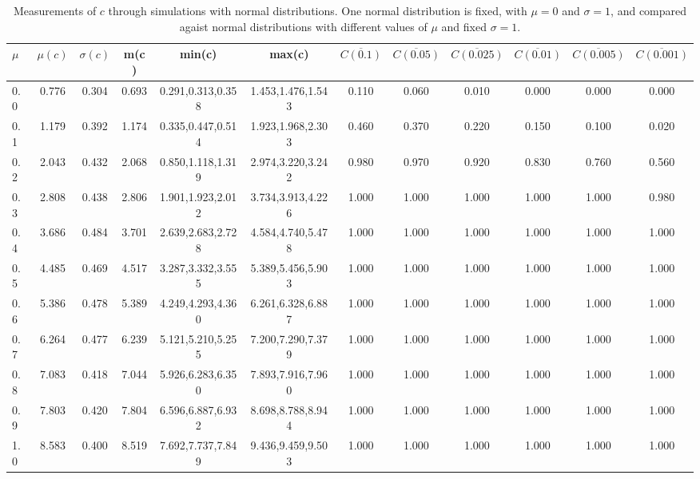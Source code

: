 \begin{table*}[h!]
\begin{center}
\begin{tabular}{| l | c | c | c | c | c | c | c | c | c | c | c |}\hline
$\mu$ & $\mu(c)$ & $\sigma(c)$ & m(c) & min(c) & max(c) & $\overline{C(0.1)}$ & $\overline{C(0.05)}$ & $\overline{C(0.025)}$ & $\overline{C(0.01)}$ & $\overline{C(0.005)}$ & $\overline{C(0.001)}$ \\\hline
0.0 & 0.776 & 0.304 & 0.693 & 0.291,0.313,0.358 & 1.453,1.476,1.543  & 0.110  & 0.060  & 0.010  & 0.000  & 0.000  & 0.000 \\\hline
0.1 & 1.179 & 0.392 & 1.174 & 0.335,0.447,0.514 & 1.923,1.968,2.303  & 0.460  & 0.370  & 0.220  & 0.150  & 0.100  & 0.020 \\\hline
0.2 & 2.043 & 0.432 & 2.068 & 0.850,1.118,1.319 & 2.974,3.220,3.242  & 0.980  & 0.970  & 0.920  & 0.830  & 0.760  & 0.560 \\\hline
0.3 & 2.808 & 0.438 & 2.806 & 1.901,1.923,2.012 & 3.734,3.913,4.226  & 1.000  & 1.000  & 1.000  & 1.000  & 1.000  & 0.980 \\\hline
0.4 & 3.686 & 0.484 & 3.701 & 2.639,2.683,2.728 & 4.584,4.740,5.478  & 1.000  & 1.000  & 1.000  & 1.000  & 1.000  & 1.000 \\\hline
0.5 & 4.485 & 0.469 & 4.517 & 3.287,3.332,3.555 & 5.389,5.456,5.903  & 1.000  & 1.000  & 1.000  & 1.000  & 1.000  & 1.000 \\\hline
0.6 & 5.386 & 0.478 & 5.389 & 4.249,4.293,4.360 & 6.261,6.328,6.887  & 1.000  & 1.000  & 1.000  & 1.000  & 1.000  & 1.000 \\\hline
0.7 & 6.264 & 0.477 & 6.239 & 5.121,5.210,5.255 & 7.200,7.290,7.379  & 1.000  & 1.000  & 1.000  & 1.000  & 1.000  & 1.000 \\\hline
0.8 & 7.083 & 0.418 & 7.044 & 5.926,6.283,6.350 & 7.893,7.916,7.960  & 1.000  & 1.000  & 1.000  & 1.000  & 1.000  & 1.000 \\\hline
0.9 & 7.803 & 0.420 & 7.804 & 6.596,6.887,6.932 & 8.698,8.788,8.944  & 1.000  & 1.000  & 1.000  & 1.000  & 1.000  & 1.000 \\\hline
1.0 & 8.583 & 0.400 & 8.519 & 7.692,7.737,7.849 & 9.436,9.459,9.503  & 1.000  & 1.000  & 1.000  & 1.000  & 1.000  & 1.000 \\\hline
\end{tabular}
\caption{Measurements of $c$ through simulations
with normal distributions.
One normal distribution is fixed, with $\mu=0$ and $\sigma=1$,
and compared agaist normal distributions with different values of $\mu$ and fixed $\sigma=1$.}
\end{center}
\end{table*}